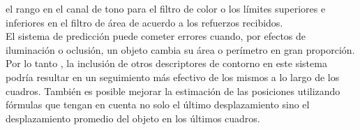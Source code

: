 el rango en el canal de tono para el filtro de color o los límites 
superiores e inferiores en el filtro de área de acuerdo a los 
refuerzos recibidos.\\
\indent El sistema de predicción puede cometer errores cuando, por 
efectos de iluminación o oclusión, un objeto cambia su área o 
perímetro en gran proporción. Por lo tanto , la inclusión de otros 
descriptores de contorno en este sistema podría resultar en un 
seguimiento más efectivo de los mismos a lo largo de los cuadros. 
También es posible mejorar la estimación de las posiciones utilizando 
fórmulas que tengan en cuenta no solo el último desplazamiento sino 
el desplazamiento promedio del objeto en los últimos cuadros.


